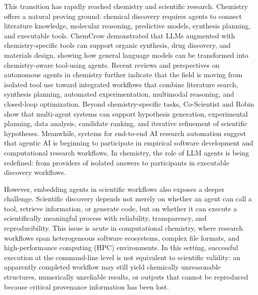 \documentclass[journal=jacsat,manuscript=article]{achemso}
\begin{document}
This transition has rapidly reached chemistry and scientific research. Chemistry offers a natural proving ground: chemical discovery requires agents to connect literature knowledge, molecular reasoning, predictive models, synthesis planning, and executable tools. ChemCrow demonstrated that LLMs augmented with chemistry-specific tools can support organic synthesis, drug discovery, and materials design, showing how general language models can be transformed into chemistry-aware tool-using agents.\cite{m.branAugmentingLargeLanguage2024} Recent reviews and perspectives on autonomous agents in chemistry further indicate that the field is moving from isolated tool use toward integrated workflows that combine literature search, synthesis planning, automated experimentation, multimodal reasoning, and closed-loop optimization.\cite{ramosReviewLargeLanguage2025,xieAutonomousChemistryMaterials2026} Beyond chemistry-specific tasks, Co-Scientist and Robin show that multi-agent systems can support hypothesis generation, experimental planning, data analysis, candidate ranking, and iterative refinement of scientific hypotheses.\cite{ghareebMultiagentSystemAutomating2026,gottweisAcceleratingScientificDiscovery2026} Meanwhile, systems for end-to-end AI research automation suggest that agentic AI is beginning to participate in empirical software development and computational research workflows.\cite{luEndtoendAutomationAI2026} In chemistry, the role of LLM agents is being redefined: from providers of isolated answers to participants in executable discovery workflows.

However, embedding agents in scientific workflows also exposes a deeper challenge. Scientific discovery depends not merely on whether an agent can call a tool, retrieve information, or generate code, but on whether it can execute a scientifically meaningful process with reliability, transparency, and reproducibility. This issue is acute in computational chemistry, where research workflows span heterogeneous software ecosystems, complex file formats, and high-performance computing (HPC) environments. In this setting, successful execution at the command-line level is not equivalent to scientific validity: an apparently completed workflow may still yield chemically unreasonable structures, numerically unreliable results, or outputs that cannot be reproduced because critical provenance information has been lost.
\end{document}
